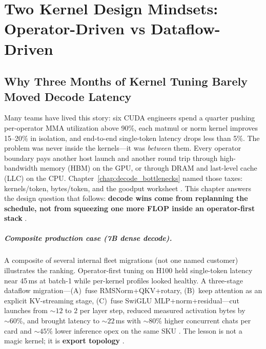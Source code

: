 \chapter{Two Kernel Design Mindsets: Operator-Driven vs Dataflow-Driven}
\label{chap:dataflow_mindset}

\section{Why Three Months of Kernel Tuning Barely Moved Decode Latency}
\label{sec:industrial_hook}

Many teams have lived this story: six CUDA engineers spend a quarter pushing per-operator MMA utilization above 90\%, each matmul or norm kernel improves 15--20\% in isolation, and end-to-end single-token latency drops less than 5\%.
The problem was never inside the kernels---it was \emph{between} them.
Every operator boundary pays another host launch and another round trip through high-bandwidth memory (HBM) on the GPU, or through DRAM and last-level cache (LLC) on the CPU.
Chapter~\ref{chap:decode_bottlenecks} named those taxes: kernels/token, bytes/token, and the goodput worksheet \citep{taxbreak2026,memoryfloor2026}.
This chapter answers the design question that follows: \textbf{decode wins come from replanning the schedule, not from squeezing one more FLOP inside an operator-first stack} \citep{chen2020compilerbasedhardw,yirage2026}.

\paragraph{Composite production case (7B dense decode).}
A composite of several internal fleet migrations (not one named customer) illustrates the ranking.
Operator-first tuning on H100 held single-token latency near 45\,ms at batch-1 while per-kernel profiles looked healthy.
A three-stage dataflow migration---(A)~fuse RMSNorm+QKV+rotary, (B)~keep attention as an explicit KV-streaming stage, (C)~fuse SwiGLU MLP+norm+residual---cut launches from ${\sim}12$ to $2$ per layer step, reduced measured activation bytes by ${\sim}60\%$, and brought latency to ${\sim}22$\,ms with ${\sim}80\%$ higher concurrent chats per card and ${\sim}45\%$ lower inference opex on the same SKU \citep{memoryfloor2026,taxbreak2026}.
The lesson is not a magic kernel; it is \textbf{export topology} \citep{patel2025llminference}.

